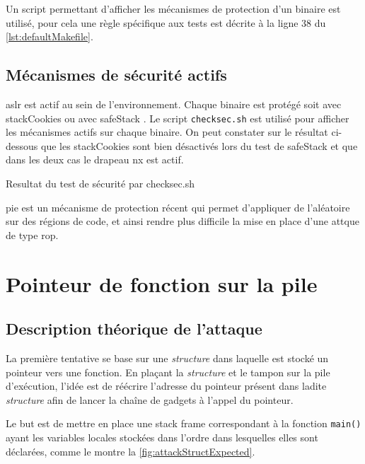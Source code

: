 Un script permettant d'afficher les mécanismes de protection d'un binaire est utilisé, pour cela une règle spécifique aux tests est décrite à la ligne 38 du \autoref{lst:defaultMakefile}.

\vfill

\subsection{Mécanismes de sécurité actifs}

\gls{aslr} est actif au sein de l'environnement. Chaque binaire est protégé soit avec \og \gls{stackCookies} \fg ou avec \og \gls{safeStack} \fg. Le script \texttt{checksec.sh} \cite{CheckSec} est utilisé pour afficher les mécanismes actifs sur chaque binaire. On peut constater sur le résultat ci-dessous que les \og \gls{stackCookies} \fg sont bien désactivés lors du test de \og \gls{safeStack} \fg et que dans les deux cas le drapeau \gls{nx} est actif.

\begin{listing}
	\caption{Resultat du test de sécurité par checksec.sh}
	\label{lst:checksecRes}
\end{listing}

\gls{pie} est un mécanisme de protection récent qui permet d'appliquer de l'aléatoire sur des régions de code, et ainsi rendre plus difficile la mise en place d'une attque de type \gls{rop}.


\section{Pointeur de fonction sur la pile}

\subsection{Description théorique de l'attaque}

La première tentative se base sur une \textit{structure} dans laquelle est stocké un pointeur vers une fonction. En plaçant la \textit{structure} et le tampon sur la pile d'exécution, l'idée est de réécrire l'adresse du pointeur présent dans ladite \textit{structure} afin de lancer la chaîne de gadgets à l'appel du pointeur.

Le but est de mettre en place une \og stack frame \fg correspondant à la fonction \texttt{main()} ayant les variables locales stockées dans l'ordre dans lesquelles elles sont déclarées, comme le montre la \autoref{fig:attackStructExpected}.

